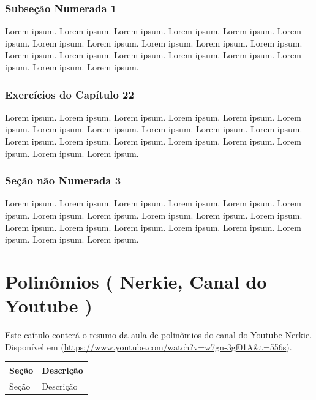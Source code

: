 \documentclass[
]{book}
\begin{document}
\hypertarget{subseuxe7uxe3o-numerada-1-3}{%
\subsection{Subseção Numerada 1}\label{subseuxe7uxe3o-numerada-1-3}}

Lorem ipsum. Lorem ipsum. Lorem ipsum. Lorem ipsum. Lorem ipsum. Lorem ipsum. Lorem ipsum. Lorem ipsum. Lorem ipsum. Lorem ipsum. Lorem ipsum. Lorem ipsum. Lorem ipsum. Lorem ipsum. Lorem ipsum. Lorem ipsum. Lorem ipsum. Lorem ipsum. Lorem ipsum.

\hypertarget{exercuxedcios-do-capuxedtulo-22}{%
\subsection{Exercícios do Capítulo 22}\label{exercuxedcios-do-capuxedtulo-22}}

Lorem ipsum. Lorem ipsum. Lorem ipsum. Lorem ipsum. Lorem ipsum. Lorem ipsum. Lorem ipsum. Lorem ipsum. Lorem ipsum. Lorem ipsum. Lorem ipsum. Lorem ipsum. Lorem ipsum. Lorem ipsum. Lorem ipsum. Lorem ipsum. Lorem ipsum. Lorem ipsum. Lorem ipsum.

\hypertarget{seuxe7uxe3o-nuxe3o-numerada-3-3}{%
\subsection*{Seção não Numerada 3}\label{seuxe7uxe3o-nuxe3o-numerada-3-3}}

Lorem ipsum. Lorem ipsum. Lorem ipsum. Lorem ipsum. Lorem ipsum. Lorem ipsum. Lorem ipsum. Lorem ipsum. Lorem ipsum. Lorem ipsum. Lorem ipsum. Lorem ipsum. Lorem ipsum. Lorem ipsum. Lorem ipsum. Lorem ipsum. Lorem ipsum. Lorem ipsum. Lorem ipsum.

\hypertarget{polinuxf4mios-nerkie-canal-do-youtube}{%
\chapter{Polinômios ( Nerkie, Canal do Youtube )}\label{polinuxf4mios-nerkie-canal-do-youtube}}

Este caítulo conterá o resumo da aula de polinômios do canal do Youtube Nerkie. Disponível em (\url{https://www.youtube.com/watch?v=w7gn-3gf01A\&t=556s}).

\begin{longtable}[]{@{}ll@{}}
\toprule()
Seção & Descrição \\
\midrule()
\endhead
Seção & Descrição \\
\bottomrule()
\end{longtable}
\end{document}
